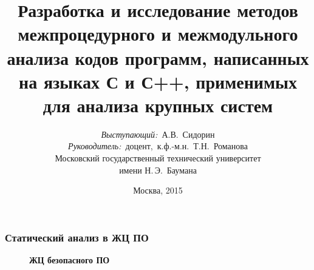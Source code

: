 \documentclass[hyperref={pdfpagelabels=false}]{beamer}
\title{\small{Разработка и  исследование методов межпроцедурного и межмодульного анализа кодов программ, написанных на языках  С и С++, применимых для анализа крупных систем}}
\author{\small{%
\emph{Выступающий:}~А.В.~Сидорин\\%
\emph{Руководитель:}~доцент,~к.ф.-м.н.~Т.Н.~Романова}\\%
\vspace{30pt}%
Московский государственный технический университет\\имени Н.\,Э.~Баумана%
\vspace{20pt}%
}
\date{\small{Москва, 2015}}
\begin{document}
\maketitle

\begin{frame}
\frametitle{Статический анализ в ЖЦ ПО}
\begin{figure}[h]
  \vfill
  \begin{minipage}[h]{\linewidth}
    \textbf{ЖЦ безопасного ПО}
  \end{minipage}
\end{figure}
\end{frame}
\end{document}
